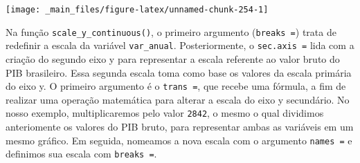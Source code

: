 \documentclass[
  brazilian,
]{book}
\newenvironment{Shaded}{\begin{snugshade}}{\end{snugshade}}
\newcommand{\AttributeTok}[1]{\textcolor[rgb]{0.77,0.63,0.00}{#1}}
\newcommand{\ConstantTok}[1]{\textcolor[rgb]{0.00,0.00,0.00}{#1}}
\newcommand{\DecValTok}[1]{\textcolor[rgb]{0.00,0.00,0.81}{#1}}
\newcommand{\FloatTok}[1]{\textcolor[rgb]{0.00,0.00,0.81}{#1}}
\newcommand{\FunctionTok}[1]{\textcolor[rgb]{0.00,0.00,0.00}{#1}}
\newcommand{\NormalTok}[1]{#1}
\newcommand{\SpecialCharTok}[1]{\textcolor[rgb]{0.00,0.00,0.00}{#1}}
\newcommand{\StringTok}[1]{\textcolor[rgb]{0.31,0.60,0.02}{#1}}
\begin{document}
\begin{Shaded}
\end{Shaded}

\begin{center}\texttt{[image: \_main\_files/figure-latex/unnamed-chunk-254-1]} \end{center}

Na função \texttt{scale\_y\_continuous()}, o primeiro argumento (\texttt{breaks\ =}) trata de redefinir a escala da variável \texttt{var\_anual}. Posteriormente, o \texttt{sec.axis\ =} lida com a criação do segundo eixo y para representar a escala referente ao valor bruto do PIB brasileiro. Essa segunda escala toma como base os valores da escala primária do eixo y. O primeiro argumento é o \texttt{trans\ =}, que recebe uma fórmula, a fim de realizar uma operação matemática para alterar a escala do eixo y secundário. No nosso exemplo, multiplicaremos pelo valor \texttt{2842}, o mesmo o qual dividimos anteriomente os valores do PIB bruto, para representar ambas as variáveis em um mesmo gráfico. Em seguida, nomeamos a nova escala com o argumento \texttt{names\ =} e definimos sua escala com \texttt{breaks\ =}.
\end{document}
